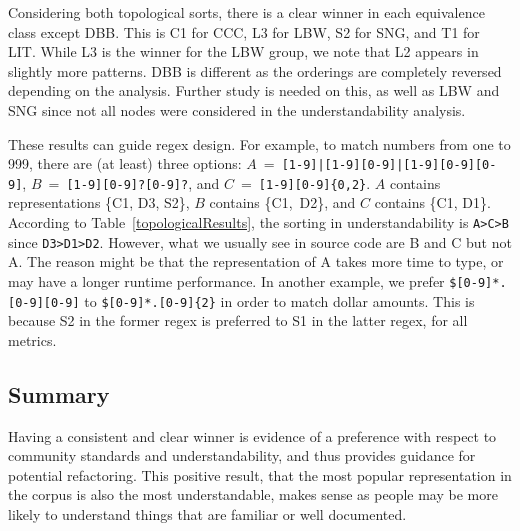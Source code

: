 Considering both topological sorts, there is a clear winner in each equivalence class except DBB. 
This is C1 for CCC, L3 for LBW, S2 for SNG, and T1 for LIT.
While L3 is the winner for the LBW group, we note that L2 appears in slightly more patterns.
DBB is different as the orderings are completely reversed depending on the analysis. %
Further study is needed on this, as well as LBW and SNG since not all nodes were considered in the understandability analysis.

These results can guide regex design.
For example, to match numbers from one to 999, there are (at least) three options: $A$~=~{\tt [1-9]|[1-9][0-9]|[1-9][0-9][0-9]}, $B$~=~{\tt [1-9][0-9]?[0-9]?}, and $C$~=~{\tt [1-9][0-9]\{0,2\}}.
$A$ contains representations \{C1, D3, S2\}, $B$ contains \{C1,~D2\}, and $C$ contains \{C1, D1\}. %
According to Table~\ref{topologicalResults}, the sorting in understandability is \texttt{A\textgreater C\textgreater B} since \texttt{D3\textgreater D1\textgreater D2}. However, what we usually see in source code are B and C but not A. The reason might be that the representation of A takes more time to type, or may have a longer runtime performance.
In another example, we prefer {\tt \$[0-9]*.[0-9][0-9]} to {\tt \$[0-9]*.[0-9]\{2\}} in order to match dollar amounts. This is because S2 in the former regex is preferred to S1 in the latter regex, for all metrics.
%

\subsection{Summary}
Having a consistent and clear winner is evidence of a preference with respect to community standards and understandability, and thus provides guidance for potential refactoring.
This positive result, that the most popular representation in the corpus is also the most understandable, makes sense as people may be more likely to understand things that are familiar or well documented.
